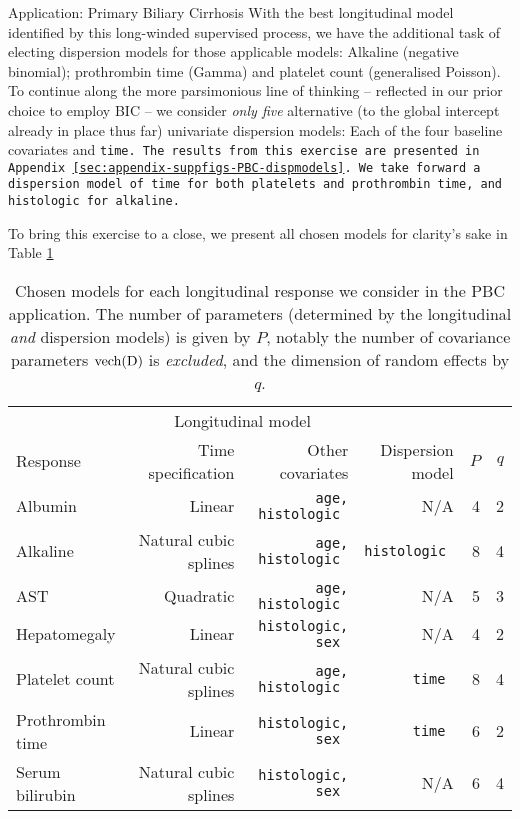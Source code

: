 \begin{chapter}{\label{cha:app-PBC}Application: Primary Biliary Cirrhosis}
  With the best longitudinal model identified by this long-winded supervised process, we have the additional task of electing dispersion models for those applicable models: Alkaline (negative binomial); prothrombin time (Gamma) and platelet count (generalised Poisson). To continue along the more parsimonious line of thinking -- reflected in our prior choice to employ BIC -- we consider \textit{only five} alternative (to the global intercept already in place thus far) univariate dispersion models: Each of the four baseline covariates and \tt{time}. The results from this exercise are presented in Appendix \ref{sec:appendix-suppfigs-PBC-dispmodels}. We take forward a dispersion model of \tt{time} for both platelets and prothrombin time, and \tt{histologic} for alkaline.

  To bring this exercise to a close, we present all chosen models for clarity's sake in Table \ref{tab:pbc-longitudinal-models}

  \begin{table}[ht]
      \centering
      \captionsetup{font=scriptsize}
      \begingroup\small
      \begin{tabular}{l|rrrrr}
       & \multicolumn{2}{c}{Longitudinal model} & \\
      Response & Time specification & Other covariates & Dispersion model & $P$ & $q$\\\hline
      Albumin & Linear & \tt{age}, \tt{histologic} & N/A & 4 & 2\\
      Alkaline & Natural cubic splines & \tt{age}, \tt{histologic} & \tt{histologic} & 8 & 4 \\
      AST & Quadratic & \tt{age}, \tt{histologic} & N/A & 5 & 3 \\
      Hepatomegaly & Linear & \tt{histologic}, \tt{sex} & N/A & 4 & 2 \\
      Platelet count & Natural cubic splines & \tt{age}, \tt{histologic} & \tt{time} & 8 & 4 \\
      Prothrombin time & Linear & \tt{histologic}, \tt{sex} & \tt{time} & 6 & 2 \\
      Serum bilirubin & Natural cubic splines & \tt{histologic}, \tt{sex} & N/A & 6 & 4\\
      \end{tabular}
      \endgroup
      \caption{Chosen models for each longitudinal response we consider in the PBC application. The number of parameters (determined by the longitudinal \textit{and} dispersion models) is given by $P$, notably the number of covariance parameters $\text{vech}\!\left(\mathrm{D}\right)$ is \textit{excluded}, and the dimension of random effects by $q$.}
      \label{tab:pbc-longitudinal-models}
  \end{table}


\end{chapter}
